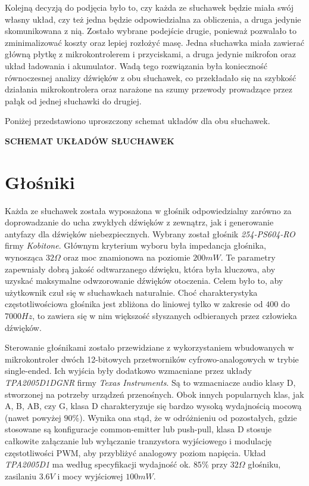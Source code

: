 Kolejną decyzją do podjęcia było to, czy każda ze słuchawek będzie miała swój własny układ, czy też jedna będzie odpowiedzialna za obliczenia, a druga jedynie skomunikowana z nią. Zostało wybrane podejście drugie, ponieważ pozwalało to zminimalizować koszty oraz lepiej rozłożyć masę. Jedna słuchawka miała zawierać główną płytkę z mikrokontrolerem i przyciskami, a druga jedynie mikrofon oraz układ ładowania i akumulator. Wadą tego rozwiązania była konieczność równoczesnej analizy dźwięków z obu słuchawek, co przekładało się na szybkość działania mikrokontrolera oraz narażone na szumy przewody prowadzące przez pałąk od jednej słuchawki do drugiej.

Poniżej przedstawiono uproszczony schemat układów dla obu słuchawek.

\textbf{SCHEMAT UKŁADÓW SŁUCHAWEK}


\section{Głośniki}
\label{cha:glosniki}

Każda ze słuchawek została wyposażona w głośnik odpowiedzialny zarówno za doprowadzanie do ucha zwykłych dźwięków z zewnątrz, jak i generowanie antyfazy dla dźwięków niebezpiecznych. Wybrany został głośnik \textit{254-PS604-RO} firmy \textit{Kobitone}. Głównym kryterium wyboru była impedancja głośnika, wynosząca $32\Omega$ oraz moc znamionowa na poziomie $ 200 mW $. Te parametry zapewniały dobrą jakość odtwarzanego dźwięku, która była kluczowa, aby uzyskać maksymalne odwzorowanie dźwięków otoczenia. Celem było to, aby użytkownik czuł się w słuchawkach naturalnie. Choć charakterystyka częstotliwościowa głośnika jest zbliżona do liniowej tylko w zakresie od $ 400 $ do $ 7000 Hz $, to zawiera się w nim większość słyszanych odbieranych przez człowieka dźwięków.

Sterowanie głośnikami zostało przewidziane z wykorzystaniem wbudowanych w mikrokontroler dwóch 12-bitowych przetworników cyfrowo-analogowych w trybie single-ended. Ich wyjścia były dodatkowo wzmacniane przez układy \textit{TPA2005D1DGNR} firmy \textit{Texas Instruments}. Są to wzmacniacze audio klasy D, stworzonej na potrzeby urządzeń przenośnych. Obok innych popularnych klas, jak A, B, AB, czy G, klasa D charakteryzuje się bardzo wysoką wydajnością mocową (nawet powyżej $ 90\% $). Wynika ona stąd, że w odróżnieniu od pozostałych, gdzie stosowane są konfiguracje common-emitter lub push-pull, klasa D stosuje całkowite załączanie lub wyłączanie tranzystora wyjściowego i modulację częstotliwości PWM, aby przybliżyć analogowy poziom napięcia\cite{AudioAmps}. Układ \textit{TPA2005D1} ma według specyfikacji wydajność ok. $ 85\% $ przy $32\Omega$ głośniku, zasilaniu $ 3.6V $ i mocy wyjściowej $ 100mW $.


